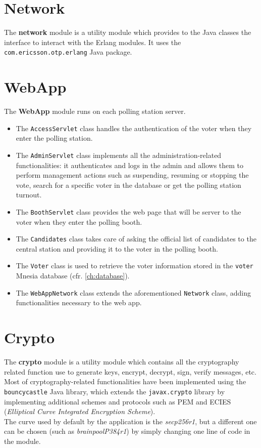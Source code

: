 \section*{Network}\label{sec:network}
The \textbf{network} module is a utility module which provides to the Java classes the interface to interact with the Erlang modules. It uses the \texttt{com.ericsson.otp.erlang} Java package.

\section*{WebApp}\label{sec:webapp}
The \textbf{WebApp} module runs on each polling station server. 
\begin{itemize}
	\item The \texttt{AccessServlet} class handles the authentication of the voter when they enter the polling station.
	\item The \texttt{AdminServlet} class implements all the administration-related functionalities: it authenticates and logs in the admin and allows them to perform management actions such as suspending, resuming or stopping the vote, search for a specific voter in the database or get the polling station turnout.
	\item The \texttt{BoothServlet} class provides the web page that will be server to the voter when they enter the polling booth.
	\item The \texttt{Candidates} class takes care of asking the official list of candidates to the central station and providing it to the voter in the polling booth.
	\item The \texttt{Voter} class is used to retrieve the voter information stored in the \texttt{voter} Mnesia database (cfr. \ref{ch:database}).
	\item The \texttt{WebAppNetwork} class extends the aforementioned \texttt{Network} class, adding functionalities necessary to the web app.
\end{itemize}

\section*{Crypto}\label{sec:crypto}
The \textbf{crypto} module is a utility module which contains all the cryptography related function use to generate keys, encrypt, decrypt, sign, verify messages, etc.\\
Most of cryptography-related functionalities have been implemented using the \texttt{bouncycastle} Java library, which extends the \texttt{javax.crypto} library by implementing additional schemes and protocols such as PEM and ECIES (\textit{Elliptical Curve Integrated Encryption Scheme}).\\
The curve used by default by the application is the \textit{secp256r1}, but a different one can be chosen (such as \textit{brainpoolP384r1}) by simply changing one line of code in the module.